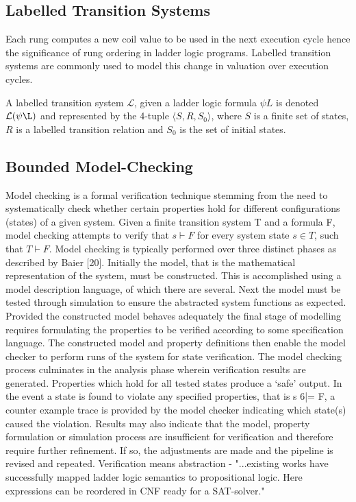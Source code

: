 \documentclass[runningheads]{llncs}
\begin{document}
\subsection{Labelled Transition Systems}
Each rung computes a new coil value to be used in the next execution cycle hence the significance of rung ordering in ladder logic programs. Labelled transition systems are commonly used to model this change in valuation over execution cycles.
\begin{definition}
	A labelled transition system $\mathcal{L}$, given a ladder logic formula $\psi L$ is denoted $\mathcal{L(\psi\L)}$ and represented by the 4-tuple $\langle S, R, S_0 \rangle$, where $S$ is a finite set of states, $R$ is a labelled transition relation and $S_0$ is the set of initial states. 
\end{definition}

\subsection{Bounded Model-Checking}
Model checking is a formal verification technique stemming from the need to systematically
check whether certain properties hold for different configurations (states) of a given system.
Given a finite transition system T and a formula F, model checking attempts to verify
that $s \vdash F$ for every system state $s \in T$, such that $T \vdash F$. Model checking is typically
performed over three distinct phases as described by Baier [20]. Initially the model, that is
the mathematical representation of the system, must be constructed. This is accomplished
using a model description language, of which there are several. Next the model must
be tested through simulation to ensure the abstracted system functions as expected.
Provided the constructed model behaves adequately the final stage of modelling requires
formulating the properties to be verified according to some specification language. The
constructed model and property definitions then enable the model checker to perform runs
of the system for state verification. The model checking process culminates in the analysis
phase wherein verification results are generated. Properties which hold for all tested states
produce a ‘safe’ output. In the event a state is found to violate any specified properties, that
is s 6|= F, a counter example trace is provided by the model checker indicating which state(s)
caused the violation. Results may also indicate that the model, property formulation or
simulation process are insufficient for verification and therefore require further refinement.
If so, the adjustments are made and the pipeline is revised and repeated.
Verification means abstraction -  "...existing works have successfully mapped ladder logic semantics to propositional logic. Here expressions can be reordered in CNF ready for a SAT-solver."
\end{document}

